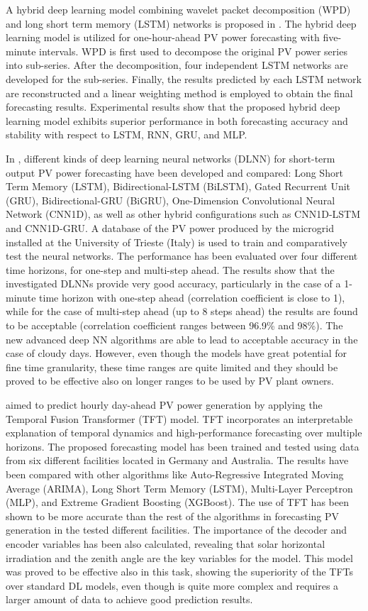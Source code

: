 A hybrid deep learning model combining wavelet packet decomposition (WPD) and long short term memory (LSTM) networks is proposed in \cite{LI2020114216}.
The hybrid deep learning model is utilized for one-hour-ahead PV power forecasting with five-minute intervals.
WPD is first used to decompose the original PV power series into sub-series.
After the decomposition, four independent LSTM networks are developed for the sub-series.
Finally, the results predicted by each LSTM network are reconstructed and a linear weighting method is employed to obtain the final forecasting results.
Experimental results show that the proposed hybrid deep learning model exhibits superior performance in both forecasting accuracy and stability with respect to LSTM, RNN, GRU, and MLP.

In \cite{MELLIT2021276}, different kinds of deep learning neural networks (DLNN) for short-term output PV power forecasting have been developed and compared: Long Short Term Memory (LSTM), Bidirectional-LSTM (BiLSTM), Gated Recurrent Unit (GRU), Bidirectional-GRU (BiGRU), One-Dimension Convolutional Neural Network (CNN1D), as well as other hybrid configurations such as CNN1D-LSTM and CNN1D-GRU.
A database of the PV power produced by the microgrid installed at the University of Trieste (Italy) is used to train and comparatively test the neural networks.
The performance has been evaluated over four different time horizons, for one-step and multi-step ahead.
The results show that the investigated DLNNs provide very good accuracy, particularly in the case of a 1-minute time horizon with one-step ahead (correlation coefficient is close to 1), while for the case of multi-step ahead (up to 8 steps ahead) the results are found to be acceptable (correlation coefficient ranges between 96.9\% and 98\%).
The new advanced deep NN algorithms are able to lead to acceptable accuracy in the case of cloudy days.
However, even though the models have great potential for fine time granularity, these time ranges are quite limited and they should be proved to be effective also on longer ranges to be used by PV plant owners.

\cite{en15145232} aimed to predict hourly day-ahead PV power generation by applying the Temporal Fusion Transformer (TFT) model.
TFT incorporates an interpretable explanation of temporal dynamics and high-performance forecasting over multiple horizons.
The proposed forecasting model has been trained and tested using data from six different facilities located in Germany and Australia.
The results have been compared with other algorithms like Auto-Regressive Integrated Moving Average (ARIMA), Long Short Term Memory (LSTM), Multi-Layer Perceptron (MLP), and Extreme Gradient Boosting (XGBoost).
The use of TFT has been shown to be more accurate than the rest of the algorithms in forecasting PV generation in the tested different facilities.
The importance of the decoder and encoder variables has been also calculated, revealing that solar horizontal irradiation and the zenith angle are the key variables for the model.
This model was proved to be effective also in this task, showing the superiority of the TFTs over standard DL models, even though is quite more complex and requires a larger amount of data to achieve good prediction results.
